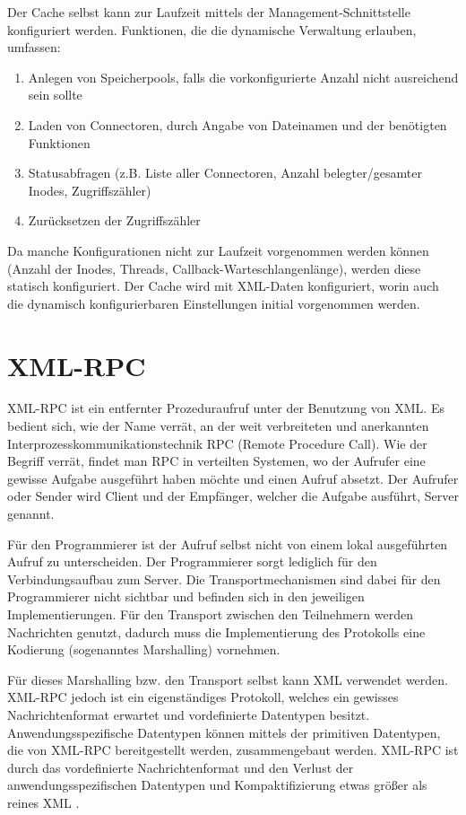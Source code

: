 Der Cache selbst kann zur Laufzeit mittels der Management-Schnittstelle konfiguriert werden.
Funktionen, die die dynamische Verwaltung erlauben, umfassen:
\begin{enumerate}
\item Anlegen von Speicherpools, falls die vorkonfigurierte Anzahl nicht ausreichend sein sollte
\item Laden von Connectoren, durch Angabe von Dateinamen und der benötigten Funktionen
\item Statusabfragen (z.B. Liste aller Connectoren, Anzahl belegter/gesamter Inodes, Zugriffszähler)
\item Zurücksetzen der Zugriffszähler
\end{enumerate}
Da manche Konfigurationen nicht zur Laufzeit vorgenommen werden können (Anzahl der Inodes, Threads,
Callback-Warteschlangenlänge), werden diese statisch konfiguriert.
Der Cache wird mit XML-Daten konfiguriert, worin auch die dynamisch konfigurierbaren Einstellungen
initial vorgenommen werden.

\section{XML-RPC}
\label{gru_xmlrpc}

XML-RPC ist ein entfernter Prozeduraufruf unter der Benutzung von XML.
Es bedient sich, wie der Name verrät, an der weit verbreiteten und anerkannten Interprozesskommunikationstechnik
RPC (Remote Procedure Call).
Wie der Begriff verrät, findet man RPC in verteilten Systemen, wo der Aufrufer eine gewisse
Aufgabe ausgeführt haben möchte und einen Aufruf absetzt.
Der Aufrufer oder Sender wird Client und der Empfänger, welcher die Aufgabe ausführt, Server genannt.

Für den Programmierer ist der Aufruf selbst nicht von einem lokal ausgeführten Aufruf zu unterscheiden.
Der Programmierer sorgt lediglich für den Verbindungsaufbau zum Server.
Die Transportmechanismen sind dabei für den Programmierer nicht sichtbar und befinden sich in den jeweiligen
Implementierungen.
Für den Transport zwischen den Teilnehmern werden Nachrichten genutzt, dadurch muss die Implementierung
des Protokolls eine Kodierung (sogenanntes Marshalling) vornehmen.

Für dieses Marshalling bzw. den Transport selbst kann XML verwendet werden.
XML-RPC jedoch ist ein eigenständiges Protokoll, welches ein gewisses Nachrichtenformat erwartet und vordefinierte
Datentypen besitzt.
Anwendungsspezifische Datentypen können mittels der primitiven Datentypen, die von XML-RPC bereitgestellt werden,
zusammengebaut werden.
XML-RPC ist durch das vordefinierte Nachrichtenformat und den Verlust der anwendungsspezifischen Datentypen
und Kompaktifizierung etwas größer als reines XML \cite{xmlrpc_so}.

